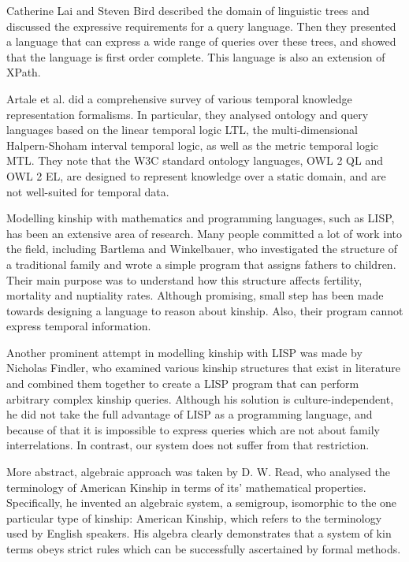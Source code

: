 Catherine Lai and Steven Bird \cite{ling} described the domain of linguistic trees and discussed the expressive requirements for a
query language. Then they presented a language that can express a wide range of queries over these trees, and showed that the
language is first order complete. This language is also an extension of XPath.

Artale et al. \cite{artale} did a comprehensive survey of various temporal knowledge representation formalisms.
In particular, they analysed ontology and query languages based on the linear
temporal logic LTL, the multi-dimensional Halpern-Shoham interval temporal logic, as well as the metric temporal logic MTL. They
note that the W3C standard ontology languages, OWL 2 QL and OWL 2 EL, are designed to represent knowledge over a static domain,
and are not well-suited for temporal data.

Modelling kinship with mathematics and programming languages, such as LISP, has been an extensive area of research.
Many people committed a lot of work into the field, including Bartlema and Winkelbauer, who investigated\cite{bartlema} the
structure of a traditional family and wrote a simple program that assigns fathers to children. Their main purpose was to
understand how this structure affects fertility, mortality and nuptiality rates. Although promising, small step has been made
towards designing a language to reason about kinship. Also, their program cannot express temporal information.

Another prominent attempt in modelling kinship with LISP was made\cite{findler} by Nicholas Findler, who examined various
kinship structures that exist in literature and combined them together to create a LISP program that can perform arbitrary complex
kinship queries. Although his solution is culture-independent, he did not take the full advantage of LISP as a programming
language, and because of that it is impossible to express queries which are not about family interrelations. In contrast, our system
does not suffer from that restriction.

More abstract, algebraic approach was taken\cite{read} by D. W. Read, who analysed the terminology of American Kinship in terms of
its' mathematical properties. Specifically, he invented an algebraic system, a semigroup, isomorphic to the one particular type of
kinship: American Kinship, which refers to the terminology used by English speakers. His algebra clearly demonstrates that a
system of kin terms obeys strict rules which can be successfully ascertained by formal methods.


